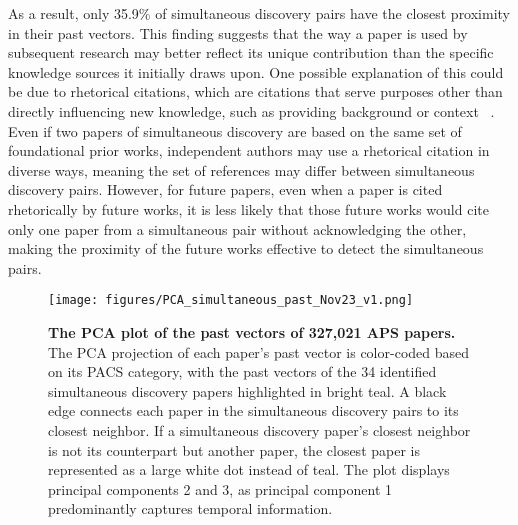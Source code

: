 \documentclass[12pt]{article}
\begin{document}
\begin{refsection}
As a result, only 35.9\% of simultaneous discovery pairs have the closest proximity in their past vectors. This finding suggests that the way a paper is used by subsequent research may better reflect its unique contribution than the specific knowledge sources it initially draws upon. One possible explanation of this could be due to rhetorical citations, which are citations that serve purposes other than directly influencing new knowledge, such as providing background or context ~\cite{bao2024simulation,teplitskiy2022status}. Even if two papers of simultaneous discovery are based on the same set of foundational prior works, independent authors may use a rhetorical citation in diverse ways, meaning the set of references may differ between simultaneous discovery pairs. However, for future papers, even when a paper is cited rhetorically by future works, it is less likely that those future works would cite only one paper from a simultaneous pair without acknowledging the other, making the proximity of the future works effective to detect the simultaneous pairs.

\begin{figure}
    \centering
    \texttt{[image: figures/PCA\_simultaneous\_past\_Nov23\_v1.png]}
    \caption{ \textbf{The PCA plot of the past vectors of 327,021 APS papers.} The PCA projection of each paper's past vector is color-coded based on its PACS category, with the past vectors of the 34 identified simultaneous discovery papers highlighted in bright teal. A black edge connects each paper in the simultaneous discovery pairs to its closest neighbor. If a simultaneous discovery paper's closest neighbor is not its counterpart but another paper, the closest paper is represented as a large white dot instead of teal. The plot displays principal components 2 and 3, as principal component 1 predominantly captures temporal information. }
    \label{fig:enter-label}
\end{figure}


\newpage






\renewcommand{\tablename}{Supplementary Table }



\end{refsection}
\end{document}
